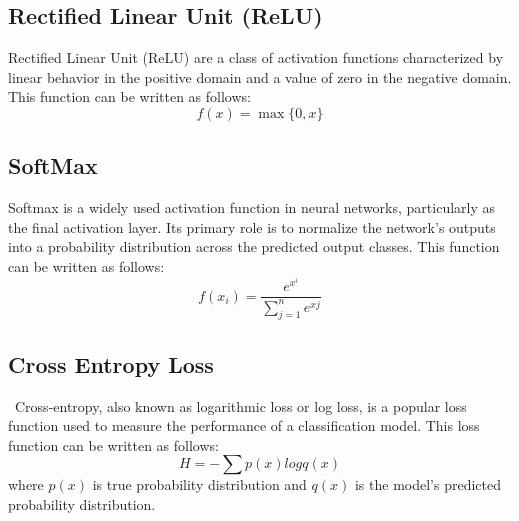 \subsection{Rectified Linear Unit (ReLU)}\label{subsec:rectified-linear-unit-(relu)}
Rectified Linear Unit (ReLU) are a class of activation functions characterized by linear behavior in the positive domain and a value of zero in the negative domain.
This function can be written as follows: $$ f(x) = \max \{0, x\}  $$


\subsection{SoftMax}\label{subsec:softmax}
Softmax is a widely used activation function in neural networks, particularly as the final activation layer.
Its primary role is to normalize the network's outputs into a probability distribution across the predicted output classes.
This function can be written as follows: $$ f(x_i) = \frac{e^{x^{i}}}{\sum_{j = 1}^{n} e^{x{j}}} $$


\subsection{Cross Entropy Loss}\label{subsec:cross-entropy-loss}\
Cross-entropy, also known as logarithmic loss or log loss, is a popular loss function used to measure the performance of a classification model.
This loss function can be written as follows: $$ H = - \sum p(x)logq(x) $$ where $p(x)$ is true probability distribution and $q(x)$ is the model’s predicted probability distribution.
